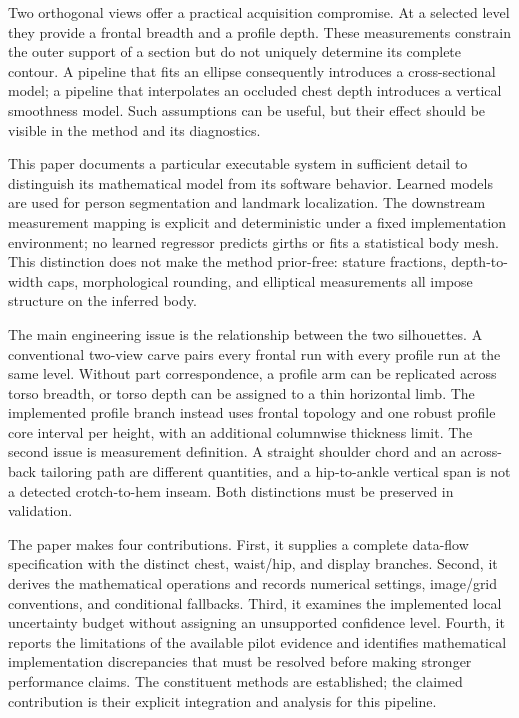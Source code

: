 \documentclass[11pt,a4paper]{article}
\numberwithin{equation}{section}
\begin{document}
Two orthogonal views offer a practical acquisition compromise. At a selected level they provide a frontal breadth and a profile depth. These measurements constrain the outer support of a section but do not uniquely determine its complete contour. A pipeline that fits an ellipse consequently introduces a cross-sectional model; a pipeline that interpolates an occluded chest depth introduces a vertical smoothness model. Such assumptions can be useful, but their effect should be visible in the method and its diagnostics.

This paper documents a particular executable system in sufficient detail to distinguish its mathematical model from its software behavior. Learned models are used for person segmentation and landmark localization. The downstream measurement mapping is explicit and deterministic under a fixed implementation environment; no learned regressor predicts girths or fits a statistical body mesh. This distinction does not make the method prior-free: stature fractions, depth-to-width caps, morphological rounding, and elliptical measurements all impose structure on the inferred body.

The main engineering issue is the relationship between the two silhouettes. A conventional two-view carve pairs every frontal run with every profile run at the same level. Without part correspondence, a profile arm can be replicated across torso breadth, or torso depth can be assigned to a thin horizontal limb. The implemented profile branch instead uses frontal topology and one robust profile core interval per height, with an additional columnwise thickness limit. The second issue is measurement definition. A straight shoulder chord and an across-back tailoring path are different quantities, and a hip-to-ankle vertical span is not a detected crotch-to-hem inseam. Both distinctions must be preserved in validation.

The paper makes four contributions. First, it supplies a complete data-flow specification with the distinct chest, waist/hip, and display branches. Second, it derives the mathematical operations and records numerical settings, image/grid conventions, and conditional fallbacks. Third, it examines the implemented local uncertainty budget without assigning an unsupported confidence level. Fourth, it reports the limitations of the available pilot evidence and identifies mathematical implementation discrepancies that must be resolved before making stronger performance claims. The constituent methods are established; the claimed contribution is their explicit integration and analysis for this pipeline.
\end{document}

